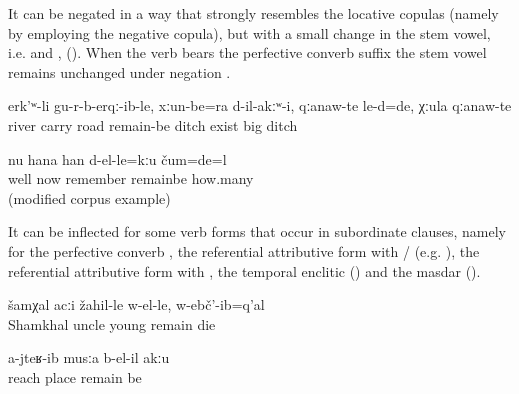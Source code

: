 It can be negated in a way that strongly resembles the locative copulas (namely by employing the negative copula), but with a small change in the stem vowel, i.e.  and  , (). When the verb  bears the perfective converb suffix  the stem vowel remains unchanged under negation .
%
\begin{exe}
	\ex	\label{ex:The river carried them away, roads had not remained, and big ditches were there}
	\gll	erk'ʷ-li	gu-r-b-erqː-ib-le,	xːun-be=ra	d-il-akːʷ-i,	qːanaw-te	le-d=de,		χːula	qːanaw-te\\
		river	carry	road	remain-be		ditch	exist		big	ditch\\
	\glt	{}

	\ex	\label{ex:Now I don't remember how many (rubles) it was. (modified example)}
	\gll	nu	hana	han	d-el-le=kːu	čum=de=l\\
		well	now	remember	remainbe	how.many\\
	\glt	{} (modified corpus example)
\end{exe}

It can be inflected for some verb forms that occur in subordinate clauses, namely for the perfective converb , the referential attributive form with  /  (e.g. ), the referential attributive form with  , the temporal enclitic  () and the masdar ().
%
\begin{exe}
	\ex	\label{ex:Uncle Shamkhal died when he was young}
	\gll	šamχal	acːi	žahil-le	w-el-le,	w-ebč'-ib=q'al\\
		Shamkhal	uncle	young	remain	die\\
	\glt	{}

	\ex	\label{ex:No place is left where I (masc.) did not go}
	\gll	a-jteʁ-ib	musːa	b-el-il	akːu\\
		reach	place	remain	be\\
	\glt	{}
\end{exe}

